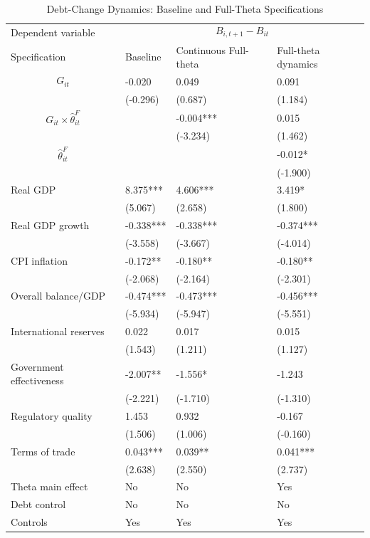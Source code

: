 \begin{table}[H]\centering
\begin{threeparttable}
\caption{Debt-Change Dynamics: Baseline and Full-Theta Specifications}
\label{tab:debt_change_combined_fulltheta}
\scriptsize
\begin{tabularx}{\textwidth}{lYYY}
\toprule
Dependent variable &  \\
\cmidrule(lr){2-4}
Specification & Baseline & Continuous Full-theta & Full-theta dynamics \\
\midrule
$$G_{it}$$ & -0.020 & 0.049 & 0.091 \\
 & (-0.296) & (0.687) & (1.184) \\
$$G_{it}\times\widehat{\theta}^{F}_{it}$$ &  & -0.004*** & 0.015 \\
 &  & (-3.234) & (1.462) \\
$$\widehat{\theta}^{F}_{it}$$ &  &  & -0.012* \\
 &  &  & (-1.900) \\
Real GDP & 8.375*** & 4.606*** & 3.419* \\
 & (5.067) & (2.658) & (1.800) \\
Real GDP growth & -0.338*** & -0.338*** & -0.374*** \\
 & (-3.558) & (-3.667) & (-4.014) \\
CPI inflation & -0.172** & -0.180** & -0.180** \\
 & (-2.068) & (-2.164) & (-2.301) \\
Overall balance/GDP & -0.474*** & -0.473*** & -0.456*** \\
 & (-5.934) & (-5.947) & (-5.551) \\
International reserves & 0.022 & 0.017 & 0.015 \\
 & (1.543) & (1.211) & (1.127) \\
Government effectiveness & -2.007** & -1.556* & -1.243 \\
 & (-2.221) & (-1.710) & (-1.310) \\
Regulatory quality & 1.453 & 0.932 & -0.167 \\
 & (1.506) & (1.006) & (-0.160) \\
Terms of trade & 0.043*** & 0.039** & 0.041*** \\
 & (2.638) & (2.550) & (2.737) \\
\midrule
Theta main effect & No & No & Yes \\
Debt control & No & No & No \\
Controls & Yes & Yes & Yes \\

\end{tabularx}
\end{threeparttable}
\end{table}
